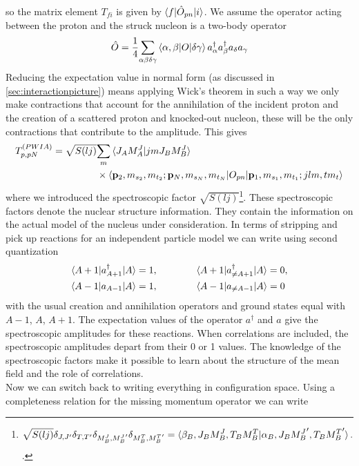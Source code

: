 \documentclass[11pt]{article}
\numberwithin{equation}{section}
\begin{document}
so the matrix element $T_{fi}$ is given by $\braket{f | \hat{O}_{pn} | i}$. We assume the operator acting between the proton and the struck nucleon is a two-body operator 
\begin{equation}
	\hat{O} = \frac{1}{4} \underset{\alpha\beta\delta\gamma}\sum \braket{\alpha, \beta | O | \delta \gamma}a_{\alpha}^{\dagger}a_{\beta}^{\dagger}a_{\delta}a_{\gamma}
\end{equation} Reducing the expectation value in normal form (as discussed in \ref{sec:interactionpicture}) means applying Wick's theorem in such a way we only make contractions that account for the annihilation of the incident proton and the creation of a scattered proton and knocked-out nucleon, these will be the only contractions that contribute to the amplitude. This gives
\begin{align}
\begin{split}
	T_{p,pN}^{(PWIA)} = \sqrt{S(lj)}& \underset{m}  \sum  \braket{J_AM_A^J | j m J_B M^J_B} \\
	 &\times \braket{\mathbf{p}_2,m_{s_2},m_{t_2} ; \mathbf{p}_N, m_{s_N}, m_{t_N} | O_{pn} | \mathbf{p}_1, m_{s_1},m_{t_1} ; jlm,t m_t}
\end{split}
\end{align}
where we introduced the spectroscopic factor $\sqrt{S(lj)}$\footnote{
\begin{equation}
	\sqrt{S(lj)}\delta_{J,J'}\delta_{T,T'}\delta_{M_B^J,{M_B^J}'}\delta_{M_B^T,{M_B^T}'} = \braket{\beta_B,J_BM_B^J, T_B M_B^T | \alpha_B, J_B{M_B^J}', T_B {M_B^T}'}.
\end{equation}.}. These spectroscopic factors denote the nuclear structure information. They contain the information on the actual model of the nucleus under consideration. In terms of stripping and pick up reactions for an independent particle model we can write using second quantization
\begin{align}
\begin{split}
\braket{A + 1 | a^{\dagger}_{A+1} | A} = 1, \qquad &\qquad  \braket{A + 1 | a^{\dagger}_{\neq A+1} | A} = 0,\\
\braket{A - 1 | a_{A-1} | A} = 1, \qquad &\qquad  \braket{A - 1 | a_{\neq A-1} | A} = 0
\end{split}  
\end{align}
with the usual creation and annihilation operators and ground states equal with $A-1$, $A$, $A+1$. The expectation values of the operator $a^{\dagger}$ and $a$ give the spectroscopic amplitudes for these reactions. When correlations are included, the spectroscopic amplitudes depart from their 0 or 1 values. The knowledge of the spectroscopic factors make it possible to learn about the structure of the mean field and the role of correlations.\\ Now we can switch back to writing everything in configuration space. Using a completeness relation for the missing momentum operator we can write
\end{document}
